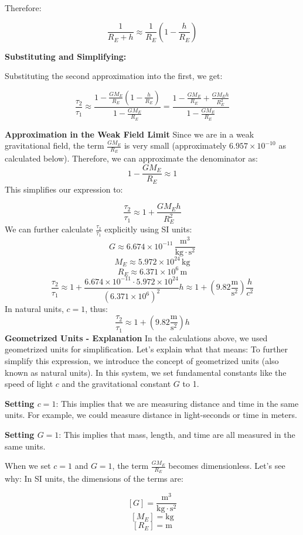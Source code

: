 \documentclass{article}
\begin{document}
Therefore:

\[
\frac{1}{R_E + h} \approx \frac{1}{R_E}\left(1 - \frac{h}{R_E}\right)
\]

\textbf{Substituting and Simplifying:}

Substituting the second approximation into the first, we get:

\[
\frac{\tau_2}{\tau_1} \approx \frac{1 - \frac{GM_E}{R_E}\left(1 - \frac{h}{R_E}\right)}{1 - \frac{GM_E}{R_E}} = \frac{1 - \frac{GM_E}{R_E} + \frac{GM_Eh}{R_E^2}}{1 - \frac{GM_E}{R_E}}
\]

\textbf{Approximation in the Weak Field Limit}
Since we are in a weak gravitational field, the term \(\frac{GM_E}{R_E}\) is very small (approximately \(6.957 \times 10^{-10}\) as calculated below). Therefore, we can approximate the denominator as:
\[
1-\frac{GM_E}{R_E} \approx 1
\]
This simplifies our expression to:

\[
\frac{\tau_2}{\tau_1} \approx 1 + \frac{GM_E h}{R_E^2}
\]
We can further calculate \(\frac{\tau_2}{\tau_1}\) explicitly using SI units:
\[
G \approx 6.674 \times 10^{-11} \, \frac{\mathrm{m^3}}{\mathrm{kg \cdot s^2}}
\]
\[
M_E \approx 5.972 \times 10^{24} \, \mathrm{kg}
\]
\[
R_E \approx 6.371 \times 10^6 \, \mathrm{m}
\]
\[
\frac{\tau_2}{\tau_1} \approx 1 + \frac{6.674 \times 10^{-11} \cdot 5.972 \times 10^{24}}{(6.371 \times 10^6)^2} h \approx 1 + (9.82 \frac{\mathrm{m}}{\mathrm{s^2}}) \frac{h}{c^2}
\]
In natural units, \(c=1\), thus:
\[
\frac{\tau_2}{\tau_1} \approx 1 + (9.82 \frac{\mathrm{m}}{\mathrm{s^2}})h
\]
\textbf{Geometrized Units - Explanation}
In the calculations above, we used geometrized units for simplification. Let's explain what that means:
To further simplify this expression, we introduce the concept of geometrized units (also known as natural units). In this system, we set fundamental constants like the speed of light \(c\) and the gravitational constant \(G\) to 1.

\textbf{Setting \(c = 1\)}: This implies that we are measuring distance and time in the same units. For example, we could measure distance in light-seconds or time in meters.

\textbf{Setting \(G = 1\)}: This implies that mass, length, and time are all measured in the same units.

When we set \(c=1\) and \(G=1\), the term \(\frac{GM_E}{R_E}\) becomes dimensionless. Let's see why:
In SI units, the dimensions of the terms are:

\[
[G] = \frac{\mathrm{m^3}}{\mathrm{kg \cdot s^2}}
\]
\[
[M_E] = \mathrm{kg}
\]
\[
[R_E] = \mathrm{m}
\]
\end{document}
